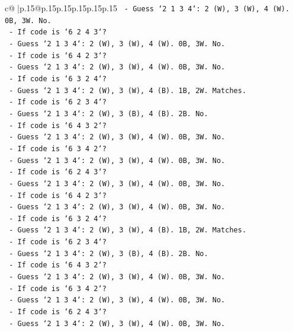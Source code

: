 \documentclass{article}
\begin{document}
{\begin{supertabular}{c@{$\;$}|p{.15\linewidth}@{}p{.15\linewidth}p{.15\linewidth}p{.15\linewidth}p{.15\linewidth}p{.15\linewidth}}
{{{\texttt{        {-} Guess `2 1 3 4`: 2 (W), 3 (W), 4 (W). 0B, 3W. No.} \\
\texttt{      {-} If code is `6 2 4 3`?} \\
\texttt{        {-} Guess `2 1 3 4`: 2 (W), 3 (W), 4 (W). 0B, 3W. No.} \\
\texttt{      {-} If code is `6 4 2 3`?} \\
\texttt{        {-} Guess `2 1 3 4`: 2 (W), 3 (W), 4 (W). 0B, 3W. No.} \\
\texttt{      {-} If code is `6 3 2 4`?} \\
\texttt{        {-} Guess `2 1 3 4`: 2 (W), 3 (W), 4 (B). 1B, 2W. Matches.} \\
\texttt{      {-} If code is `6 2 3 4`?} \\
\texttt{        {-} Guess `2 1 3 4`: 2 (W), 3 (B), 4 (B). 2B. No.} \\
\texttt{      {-} If code is `6 4 3 2`?} \\
\texttt{        {-} Guess `2 1 3 4`: 2 (W), 3 (W), 4 (W). 0B, 3W. No.} \\
\texttt{      {-} If code is `6 3 4 2`?} \\
\texttt{        {-} Guess `2 1 3 4`: 2 (W), 3 (W), 4 (W). 0B, 3W. No.} \\
\texttt{      {-} If code is `6 2 4 3`?} \\
\texttt{        {-} Guess `2 1 3 4`: 2 (W), 3 (W), 4 (W). 0B, 3W. No.} \\
\texttt{      {-} If code is `6 4 2 3`?} \\
\texttt{        {-} Guess `2 1 3 4`: 2 (W), 3 (W), 4 (W). 0B, 3W. No.} \\
\texttt{      {-} If code is `6 3 2 4`?} \\
\texttt{        {-} Guess `2 1 3 4`: 2 (W), 3 (W), 4 (B). 1B, 2W. Matches.} \\
\texttt{      {-} If code is `6 2 3 4`?} \\
\texttt{        {-} Guess `2 1 3 4`: 2 (W), 3 (B), 4 (B). 2B. No.} \\
\texttt{      {-} If code is `6 4 3 2`?} \\
\texttt{        {-} Guess `2 1 3 4`: 2 (W), 3 (W), 4 (W). 0B, 3W. No.} \\
\texttt{      {-} If code is `6 3 4 2`?} \\
\texttt{        {-} Guess `2 1 3 4`: 2 (W), 3 (W), 4 (W). 0B, 3W. No.} \\
\texttt{      {-} If code is `6 2 4 3`?} \\
\texttt{        {-} Guess `2 1 3 4`: 2 (W), 3 (W), 4 (W). 0B, 3W. No.} \\
}}}
\end{supertabular}}
\end{document}
